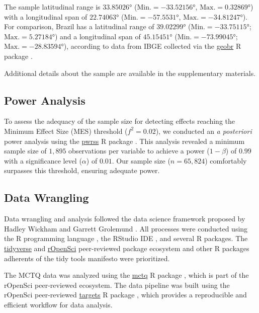 \documentclass[
12pt,
openright,
oneside,
a4paper,
chapter=TITLE,
section=TITLE,
french,
spanish,
brazil,
english
]{abntex2}
\begin{document}
The sample latitudinal range is \(33.85026°\)
(\(\text{Min.} = -33.52156°\), \(\text{Max.} = 0.32869°\)) with a
longitudinal span of \(22.74063°\) (\(\text{Min.} = -57.5531°\),
\(\text{Max.} = -34.81247°\)). For comparison, Brazil has a latitudinal
range of \(39.02299°\) (\(\text{Min.} = -33.75115°\);
\(\text{Max.} = 5.27184°\)) and a longitudinal span of \(45.15451°\)
(\(\text{Min.} = -73.99045°\); \(\text{Max.} = -28.83594°\)), according
to data from IBGE collected via the
\href{https://ipeagit.github.io/geobr/index.html\%3E}{geobr} R package
\autocite{pereira}.

Additional details about the sample are available in the supplementary
materials.

\subsection{Power Analysis}\label{power-analysis}

To assess the adequacy of the sample size for detecting effects reaching
the Minimum Effect Size (MES) threshold (\(f^2 = 0.02\)), we conducted
an \emph{a posteriori} power analysis using the
\href{https://cran.r-project.org/web/packages/pwrss/vignettes/examples.html}{pwrss}
R package \autocite{bulus}. This analysis revealed a minimum sample size
of \(1,895\) observations per variable to achieve a power
(\(1 - \beta\)) of \(0.99\) with a significance level (\(\alpha\)) of
\(0.01\). Our sample size (\(n = 65,824\)) comfortably surpasses this
threshold, ensuring adequate power.

\subsection{Data Wrangling}\label{data-wrangling}

Data wrangling and analysis followed the data science framework proposed
by Hadley Wickham and Garrett Grolemund \autocite{wickham2023e}. All
processes were conducted using the R programming language
\autocite{rcoreteama}, the RStudio IDE \autocite{positteama}, and
several R packages. The \href{https://www.tidyverse.org/}{tidyverse} and
\href{https://ropensci.org/}{rOpenSci} peer-reviewed package ecosystem
and other R packages adherents of the tidy tools manifesto
\autocite{wickham2023c} were prioritized.

The MCTQ data was analyzed using the
\href{https://docs.ropensci.org/mctq/}{mctq} R package
\autocite{vartanianh}, which is part of the rOpenSci peer-reviewed
ecosystem. The data pipeline was built using the rOpenSci peer-reviewed
\href{https://books.ropensci.org/targets/}{targets} R package
\autocite{landau2021a}, which provides a reproducible and efficient
workflow for data analysis.
\end{document}
